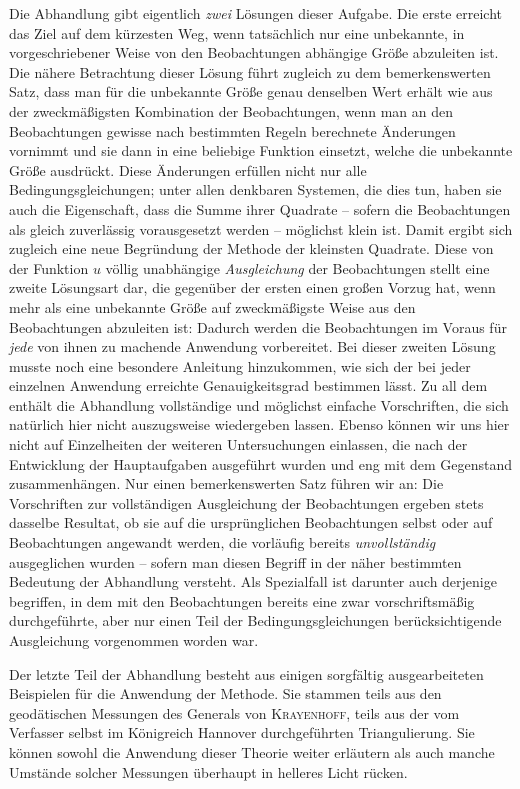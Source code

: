Die Abhandlung gibt eigentlich \textit{zwei} Lösungen dieser Aufgabe. Die erste erreicht das Ziel auf dem kürzesten Weg, wenn tatsächlich nur eine unbekannte, in vorgeschriebener Weise von den Beobachtungen abhängige Größe abzuleiten ist. Die nähere Betrachtung dieser Lösung führt zugleich zu dem bemerkenswerten Satz, dass man für die unbekannte Größe genau denselben Wert erhält wie aus der zweckmäßigsten Kombination der Beobachtungen, wenn man an den Beobachtungen gewisse nach bestimmten Regeln berechnete Änderungen vornimmt und sie dann in eine beliebige Funktion einsetzt, welche die unbekannte Größe ausdrückt. Diese Änderungen erfüllen nicht nur alle Bedingungsgleichungen; unter allen denkbaren Systemen, die dies tun, haben sie auch die Eigenschaft, dass die Summe ihrer Quadrate – sofern die Beobachtungen als gleich zuverlässig vorausgesetzt werden – möglichst klein ist. Damit ergibt sich zugleich eine neue Begründung der Methode der kleinsten Quadrate. Diese von der Funktion \(u\) völlig unabhängige \textit{Ausgleichung} der Beobachtungen stellt eine zweite Lösungsart dar, die gegenüber der ersten einen großen Vorzug hat, wenn mehr als eine unbekannte Größe auf zweckmäßigste Weise aus den Beobachtungen abzuleiten ist: Dadurch werden die Beobachtungen im Voraus für \textit{jede} von ihnen zu machende Anwendung vorbereitet. Bei dieser zweiten Lösung musste noch eine besondere Anleitung hinzukommen, wie sich der bei jeder einzelnen Anwendung erreichte Genauigkeitsgrad bestimmen lässt. Zu all dem enthält die Abhandlung vollständige und möglichst einfache Vorschriften, die sich natürlich hier nicht auszugsweise wiedergeben lassen. Ebenso können wir uns hier nicht auf Einzelheiten der weiteren Untersuchungen einlassen, die nach der Entwicklung der Hauptaufgaben ausgeführt wurden und eng mit dem Gegenstand zusammenhängen. Nur einen bemerkenswerten Satz führen wir an: %
Die Vorschriften zur vollständigen Ausgleichung der Beobachtungen ergeben stets dasselbe Resultat, ob sie auf die ursprünglichen Beobachtungen selbst oder auf Beobachtungen angewandt werden, die vorläufig bereits \textit{unvollständig} ausgeglichen wurden – sofern man diesen Begriff in der näher bestimmten Bedeutung der Abhandlung versteht. Als Spezialfall ist darunter auch derjenige begriffen, in dem mit den Beobachtungen bereits eine zwar vorschriftsmäßig durchgeführte, aber nur einen Teil der Bedingungsgleichungen berücksichtigende Ausgleichung vorgenommen worden war.

Der letzte Teil der Abhandlung besteht aus einigen sorgfältig ausgearbeiteten Beispielen für die Anwendung der Methode. Sie stammen teils aus den geodätischen Messungen des Generals von \textsc{Krayenhoff}, teils aus der vom Verfasser selbst im Königreich Hannover durchgeführten Triangulierung. Sie können sowohl die Anwendung dieser Theorie weiter erläutern als auch manche Umstände solcher Messungen überhaupt in helleres Licht rücken.

